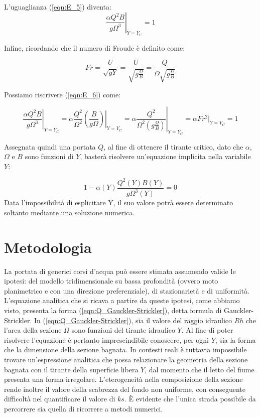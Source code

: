 \documentclass[12pt]{article} %
\begin{document}
\noindent L’uguaglianza (\ref{eqn:E_5}) diventa:
\begin{equation}
    \left.\frac{\alpha Q^{2}B}{g\Omega^{3}}\right|_{Y=Y_{C}}=1
    \label{eqn:E_6}
\end{equation}

\noindent Infine, ricordando che il numero di Froude è definito come:

\begin{equation}
    Fr=\frac{U}{\sqrt{gY}}=\frac{U}{\sqrt{g\frac{\Omega}{B}}}=\frac{Q}{\Omega \sqrt{g\frac{\Omega}{B}}}
    \label{eqn:Froude}
\end{equation}

\noindent Possiamo riscrivere (\ref{eqn:E_6}) come:

\begin{equation}
    \left.\frac{\alpha Q^{2}B}{g\Omega^{3}}\right|_{Y=Y_C}=\alpha \frac {Q^{2}}{\Omega^{2}}\left.\left(\frac{B}{g\Omega}\right)\right|_{Y=Y_C}=\alpha\left.\frac {Q^{2}}{\Omega^{2}\left(g\frac{\Omega}{B}\right)}\right|_{Y=Y_{C}}=\alpha Fr^{2}|_{Y=Y_C}=1
    \label{eqn:E_7}
\end{equation}

\noindent Assegnata quindi una portata $Q$, al fine di ottenere il tirante critico, dato che $\alpha$, $\Omega$ e $B$ sono funzioni di $Y$, basterà risolvere un’equazione implicita nella variabile $Y$:

\begin{equation}
    1-\alpha(Y)\frac{Q^{2}(Y)B(Y)}{g\Omega^{3}(Y)}=0
    \label{eqn:E_8}
\end{equation}
\noindent Data l'impossibilità di esplicitare Y, il suo valore potrà essere determinato soltanto mediante una soluzione numerica.

\newpage
\section{Metodologia}

\noindent La portata di generici corsi d’acqua può essere stimata assumendo valide le ipotesi: del modello tridimensionale su bassa profondità (ovvero moto planimetrico e con una direzione preferenziale), di stazionarietà e di uniformità. L’equazione analitica che si ricava a partire da queste ipotesi, come abbiamo visto, presenta la forma (\ref{eqn:Q_Gauckler-Strickler}), detta formula di Gauckler-Strickler.
In (\ref{eqn:Q_Gauckler-Strickler}), sia il valore del raggio idraulico $Rh$ che l’area della sezione $\Omega$ sono funzioni del tirante idraulico $Y$. Al fine di poter risolvere l’equazione è pertanto imprescindibile conoscere, per ogni $Y$, sia la forma che la dimensione della sezione bagnata. In contesti reali è tuttavia impossibile trovare un'espressione analitica che possa relazionare la geometria della sezione bagnata con il tirante della superficie libera $Y$, dal momento che il letto del fiume presenta una forma irregolare. L’eterogeneità nella composizione della sezione rende inoltre il valore della scabrezza del fondo non uniforme, con conseguente difficoltà nel quantificare il valore di $ks$. È evidente che l’unica strada possibile da percorrere sia quella di ricorrere a metodi numerici.
\end{document}
